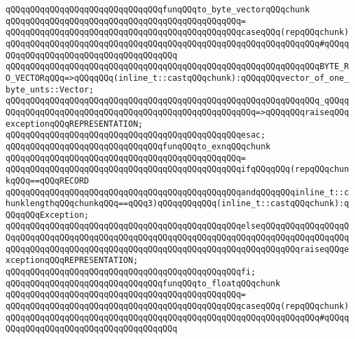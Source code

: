 \verb|qQQqqQQqqQQqqQQqqQQqqQQqqQQqqQQqfunqQQqto_byte_vectorqQQqchunk|\newline
\verb|qQQqqQQqqQQqqQQqqQQqqQQqqQQqqQQqqQQqqQQqqQQqqQQq=|\newline
\verb|qQQqqQQqqQQqqQQqqQQqqQQqqQQqqQQqqQQqqQQqqQQqqQQqcaseqQQq(repqQQqchunk)|\newline
\verb|qQQqqQQqqQQqqQQqqQQqqQQqqQQqqQQqqQQqqQQqqQQqqQQqqQQqqQQqqQQqqQQq#qQQqqQQqqQQqqQQqqQQqqQQqqQQqqQQqqQQqqQQq|\newline
\verb|qQQqqQQqqQQqqQQqqQQqqQQqqQQqqQQqqQQqqQQqqQQqqQQqqQQqqQQqqQQqqQQqBYTE_RO_VECTORqQQq=>qQQqqQQq(inline_t::castqQQqchunk):qQQqqQQqvector_of_one_byte_unts::Vector;|\newline
\verb|qQQqqQQqqQQqqQQqqQQqqQQqqQQqqQQqqQQqqQQqqQQqqQQqqQQqqQQqqQQqqQQq_qQQqqQQqqQQqqQQqqQQqqQQqqQQqqQQqqQQqqQQqqQQqqQQqqQQqqQQq=>qQQqqQQqraiseqQQqexceptionqQQqREPRESENTATION;|\newline
\verb|qQQqqQQqqQQqqQQqqQQqqQQqqQQqqQQqqQQqqQQqqQQqqQQqesac;|\newline
\newline
\verb|qQQqqQQqqQQqqQQqqQQqqQQqqQQqqQQqfunqQQqto_exnqQQqchunk|\newline
\verb|qQQqqQQqqQQqqQQqqQQqqQQqqQQqqQQqqQQqqQQqqQQqqQQq=|\newline
\verb|qQQqqQQqqQQqqQQqqQQqqQQqqQQqqQQqqQQqqQQqqQQqqQQqifqQQqqQQq(repqQQqchunkqQQq==qQQqRECORD|\newline
\verb|qQQqqQQqqQQqqQQqqQQqqQQqqQQqqQQqqQQqqQQqqQQqqQQqandqQQqqQQqinline_t::chunklengthqQQqchunkqQQq==qQQq3)qQQqqQQqqQQq(inline_t::castqQQqchunk):qQQqqQQqException;|\newline
\verb|qQQqqQQqqQQqqQQqqQQqqQQqqQQqqQQqqQQqqQQqqQQqqQQqelseqQQqqQQqqQQqqQQqqQQqqQQqqQQqqQQqqQQqqQQqqQQqqQQqqQQqqQQqqQQqqQQqqQQqqQQqqQQqqQQqqQQqqQQqqQQqqQQqqQQqqQQqqQQqqQQqqQQqqQQqqQQqqQQqqQQqqQQqqQQqqQQqqQQqraiseqQQqexceptionqQQqREPRESENTATION;|\newline
\verb|qQQqqQQqqQQqqQQqqQQqqQQqqQQqqQQqqQQqqQQqqQQqqQQqfi;|\newline
\newline
\verb|qQQqqQQqqQQqqQQqqQQqqQQqqQQqqQQqfunqQQqto_floatqQQqchunk|\newline
\verb|qQQqqQQqqQQqqQQqqQQqqQQqqQQqqQQqqQQqqQQqqQQqqQQq=|\newline
\verb|qQQqqQQqqQQqqQQqqQQqqQQqqQQqqQQqqQQqqQQqqQQqqQQqcaseqQQq(repqQQqchunk)|\newline
\verb|qQQqqQQqqQQqqQQqqQQqqQQqqQQqqQQqqQQqqQQqqQQqqQQqqQQqqQQqqQQqqQQq#qQQqqQQqqQQqqQQqqQQqqQQqqQQqqQQqqQQqqQQq|\newline
